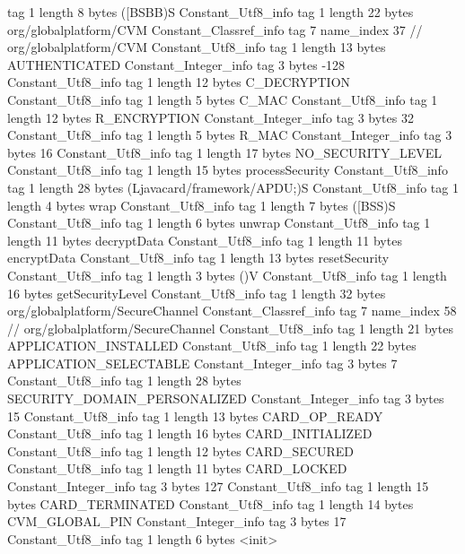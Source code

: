 {{{			tag	1
			length	8
			bytes	([BSBB)S
		}
		Constant_Utf8_info {
			tag	1
			length	22
			bytes	org/globalplatform/CVM
		}
		Constant_Classref_info {
			tag	7
			name_index	37		// org/globalplatform/CVM
		}
		Constant_Utf8_info {
			tag	1
			length	13
			bytes	AUTHENTICATED
		}
		Constant_Integer_info {
			tag	3
			bytes	-128
		}
		Constant_Utf8_info {
			tag	1
			length	12
			bytes	C_DECRYPTION
		}
		Constant_Utf8_info {
			tag	1
			length	5
			bytes	C_MAC
		}
		Constant_Utf8_info {
			tag	1
			length	12
			bytes	R_ENCRYPTION
		}
		Constant_Integer_info {
			tag	3
			bytes	32
		}
		Constant_Utf8_info {
			tag	1
			length	5
			bytes	R_MAC
		}
		Constant_Integer_info {
			tag	3
			bytes	16
		}
		Constant_Utf8_info {
			tag	1
			length	17
			bytes	NO_SECURITY_LEVEL
		}
		Constant_Utf8_info {
			tag	1
			length	15
			bytes	processSecurity
		}
		Constant_Utf8_info {
			tag	1
			length	28
			bytes	(Ljavacard/framework/APDU;)S
		}
		Constant_Utf8_info {
			tag	1
			length	4
			bytes	wrap
		}
		Constant_Utf8_info {
			tag	1
			length	7
			bytes	([BSS)S
		}
		Constant_Utf8_info {
			tag	1
			length	6
			bytes	unwrap
		}
		Constant_Utf8_info {
			tag	1
			length	11
			bytes	decryptData
		}
		Constant_Utf8_info {
			tag	1
			length	11
			bytes	encryptData
		}
		Constant_Utf8_info {
			tag	1
			length	13
			bytes	resetSecurity
		}
		Constant_Utf8_info {
			tag	1
			length	3
			bytes	()V
		}
		Constant_Utf8_info {
			tag	1
			length	16
			bytes	getSecurityLevel
		}
		Constant_Utf8_info {
			tag	1
			length	32
			bytes	org/globalplatform/SecureChannel
		}
		Constant_Classref_info {
			tag	7
			name_index	58		// org/globalplatform/SecureChannel
		}
		Constant_Utf8_info {
			tag	1
			length	21
			bytes	APPLICATION_INSTALLED
		}
		Constant_Utf8_info {
			tag	1
			length	22
			bytes	APPLICATION_SELECTABLE
		}
		Constant_Integer_info {
			tag	3
			bytes	7
		}
		Constant_Utf8_info {
			tag	1
			length	28
			bytes	SECURITY_DOMAIN_PERSONALIZED
		}
		Constant_Integer_info {
			tag	3
			bytes	15
		}
		Constant_Utf8_info {
			tag	1
			length	13
			bytes	CARD_OP_READY
		}
		Constant_Utf8_info {
			tag	1
			length	16
			bytes	CARD_INITIALIZED
		}
		Constant_Utf8_info {
			tag	1
			length	12
			bytes	CARD_SECURED
		}
		Constant_Utf8_info {
			tag	1
			length	11
			bytes	CARD_LOCKED
		}
		Constant_Integer_info {
			tag	3
			bytes	127
		}
		Constant_Utf8_info {
			tag	1
			length	15
			bytes	CARD_TERMINATED
		}
		Constant_Utf8_info {
			tag	1
			length	14
			bytes	CVM_GLOBAL_PIN
		}
		Constant_Integer_info {
			tag	3
			bytes	17
		}
		Constant_Utf8_info {
			tag	1
			length	6
			bytes	<init>
}}}
